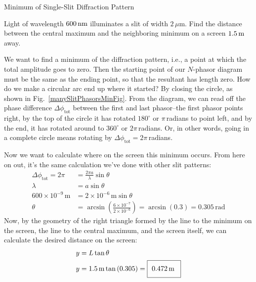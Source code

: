 \begin{example}{Minimum of Single-Slit Diffraction Pattern}
\label{exampleSingleSlit}



Light of wavelength $600\,\mbox{nm}$ illuminates a slit of
width $2\,\mu$m. Find the distance between the central maximum and the
neighboring minimum on a screen $1.5\,\mbox{m}$ away.

\solution
We want to find a minimum of the diffraction
pattern, i.e., a point at which the total amplitude goes to zero.
Then the starting point of our $N$-phasor diagram must be the same as
the ending point, so that the resultant has length zero.  How do we
make a circular arc end up where it started?  By closing the circle,
as shown in Fig.~\ref{manySlitPhasorsMinFig}.  From the diagram, we can read off the phase
difference $\Delta\phi_\text{tot}$ between the first and last
phasor--the first phasor points right, by the top of the circle it has
rotated $180^\circ$ or $\pi$\,radians to point left, and by the end,
it has rotated around to $360^\circ$ or $2\pi$\,radians.  Or, in other words,
 going in
a complete circle means rotating by
$\Delta\phi_\text{tot}=2\pi$\,radians.

Now we want to calculate where on the screen  this minimum occurs.
 From here on out, it's
the same calculation we've done with other slit patterns:
\begin{align*} 
\Delta\phi_\text{tot}=2\pi&=\frac{2\pi
a}{\lambda}\sin\theta\\ 
\lambda &= a\sin\theta\\
600\times 10^{-9}\,\text{m} &= 2\times 10^{-6}\,\text{m} \sin\theta\\
\theta&=\arcsin \left(
\frac{6\times 10^{-7}}{2\times 10^{-6}} \right)
=  \arcsin \left(0.3\right) = 0.305\,\text{rad}
\end{align*}
Now, by the geometry of the right triangle formed by the line
to the minimum on the screen, the line to the central maximum, and the screen itself, we can calculate the desired distance on the screen:
\begin{align*}
y &= L \tan\theta \\ 
y&=1.5\,\text{m} \tan\left( 0.305 
\right)= \fbox{\,\,0.472\,m\phantom{\Big (}}
\end{align*}
\end{example}

